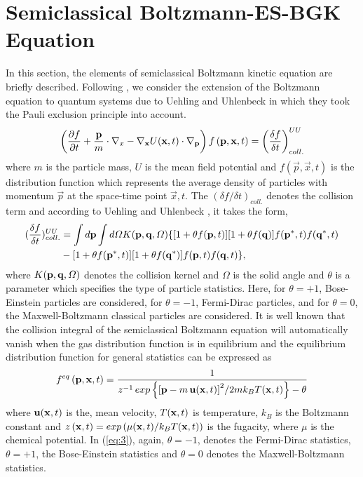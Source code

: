 \documentclass{rsproca}%
\begin{document}
\section{Semiclassical Boltzmann-ES-BGK Equation}
\label{sec:2}
In this section, the elements of semiclassical Boltzmann kinetic equation are briefly described.   Following \cite{PhysRev.43.552,KadanoffBaym}, we consider the extension of the Boltzmann equation to quantum systems due to Uehling and Uhlenbeck  in which they took the Pauli exclusion principle into account.
\begin{equation}
\left(\frac{\partial f}{\partial t}+\frac{\bf p}{m}\cdot {\bf\nabla }_x-{\bf \nabla}_{\bf x} U({\bf x},t)\cdot {\bf\nabla }_{\bf p}\right)f\left({\bf p},{\bf x},t\right)=\left(\frac{\delta f}{\delta t}\right)^{UU}_{coll.}
\end{equation}
where $m$ is the particle mass, $U$ is the mean field potential and $f(\vec p, \vec x, t)$ is the distribution function
which represents the average density of particles with momentum $\vec p$ at the space-time point $\vec x, t$. The $(\delta f
/\delta t)_{coll.}$ denotes the collision term and according to Uehling and Uhlenbeck \cite{PhysRev.43.552}, it takes the form,
\begin{align}
(\frac{\delta f} {\delta t})^{UU}_{coll.} &= \int d {\bf p} \int d\Omega
K({\bf p}, {\bf q}, \Omega) \{ [ 1+ \theta f({\bf p}, t)][1+ \theta f({\bf q})]f({\bf p}^*, t)f({\bf q}^*, t) \nonumber \\
&- [ 1+ \theta f({\bf p}^*, t)][1+ \theta f({\bf q}^*)]f({\bf p}, t)f({\bf q}, t) \},
\end{align}
where $K({\bf p}, {\bf q}, \Omega)$ denotes the collision kernel and $\Omega$ is the solid angle and $\theta$ is a parameter which specifies the type of particle statistics.   Here, for $\theta=+1$, Bose-Einstein particles are considered, for $\theta=-1$, Fermi-Dirac particles, and for $\theta=0$, the Maxwell-Boltzmann classical particles are considered.  It is well known that the collision integral of the semiclassical Boltzmann equation will automatically vanish when the gas distribution function is in equilibrium and the equilibrium distribution function for general statistics can be expressed as
\begin{equation}
f^{eq}\left({\bf p},{\bf x},t\right) =\frac{1}{z^{-1}\,exp\left\{{\left[{\bf p}-m\,{\bf u}({\bf x},t) \right]}^2/2mk_BT({\bf x},t)\right\} -\theta }
\end{equation}
where $ {\bf u}({\bf x},t)$ is the, mean velocity, $T({\bf x},t)$ is temperature, $k_B$ is the Boltzmann constant and $z\left({\bf x},t\right)= exp\left({\mu ({\bf x},t)/k_BT({\bf x},t)}\right)$ is the fugacity, where $\mu$ is the chemical potential.  In (\ref{eq:3}), again, \(\theta=-1\), denotes the Fermi-Dirac statistics, \(\theta=+1\), the Bose-Einstein statistics and \(\theta=0\) denotes the Maxwell-Boltzmann statistics.
\end{document}
